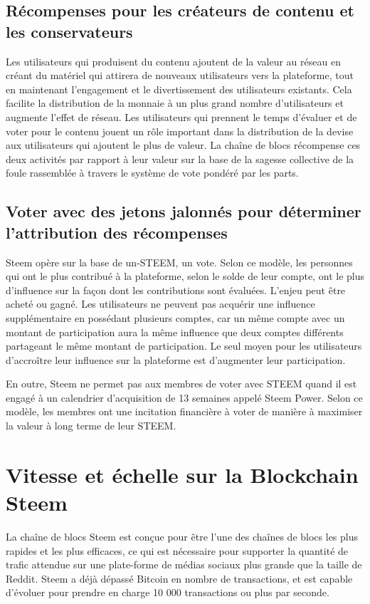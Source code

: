 \documentclass[11pt]{article}
\begin{document}
\subsection{Récompenses pour les créateurs de contenu et les conservateurs}
\label{sec:org8388cad}
Les utilisateurs qui produisent du contenu ajoutent de la valeur au
réseau en créant du matériel qui attirera de nouveaux utilisateurs
vers la plateforme, tout en maintenant l'engagement et le
divertissement des utilisateurs existants. Cela facilite la
distribution de la monnaie à un plus grand nombre d'utilisateurs et
augmente l'effet de réseau. Les utilisateurs qui prennent le temps
d'évaluer et de voter pour le contenu jouent un rôle important dans
la distribution de la devise aux utilisateurs qui ajoutent le plus
de valeur. La chaîne de blocs récompense ces deux activités par rapport
à leur valeur sur la base de la sagesse collective de la foule
rassemblée à travers le système de vote pondéré par les parts.
\subsection{Voter avec des jetons jalonnés pour déterminer l'attribution des récompenses}
\label{sec:orgb29a2f3}
Steem opère sur la base de un-STEEM, un vote. Selon ce modèle, les
personnes qui ont le plus contribué à la plateforme, selon le solde
de leur compte, ont le plus d'influence sur la façon dont les
contributions sont évaluées. L'enjeu peut être acheté ou gagné. Les
utilisateurs ne peuvent pas acquérir une influence supplémentaire
en possédant plusieurs comptes, car un même compte avec un montant
de participation aura la même influence que deux comptes différents
partageant le même montant de participation. Le seul moyen pour les
utilisateurs d'accroître leur influence sur la plateforme est
d'augmenter leur participation.

En outre, Steem ne permet pas aux membres de voter avec STEEM quand il
est engagé à un calendrier d'acquisition de 13 semaines appelé
Steem Power. Selon ce modèle, les membres ont une incitation
financière à voter de manière à maximiser la valeur à long terme de
leur STEEM.
\section{Vitesse et échelle sur la Blockchain Steem}
\label{sec:org882bf6f}
La chaîne de blocs Steem est conçue pour être l'une des chaînes de blocs
les plus rapides et les plus efficaces, ce qui est nécessaire pour
supporter la quantité de trafic attendue sur une plate-forme de
médias sociaux plus grande que la taille de Reddit. Steem a déjà
dépassé Bitcoin en nombre de transactions, et est capable d'évoluer
pour prendre en charge 10 000 transactions ou plus par seconde.
\end{document}
